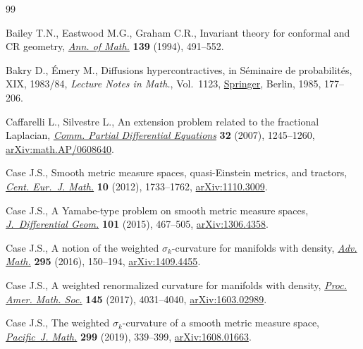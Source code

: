 \documentclass[pdftex]{sigma}
\numberwithin{equation}{section}
\begin{document}
\begin{thebibliography}{99}
\footnotesize\itemsep=-1pt

Bailey T.N., Eastwood M.G., Graham C.R., Invariant theory for conformal and
 {CR} geometry, \href{https://doi.org/10.2307/2118571}{\textit{Ann. of Math.}} \textbf{139} (1994), 491--552.

Bakry D., \'Emery M., Diffusions hypercontractives, in S\'eminaire de
 probabilit\'es, {XIX}, 1983/84, \textit{Lecture Notes in Math.}, Vol.~1123,
 \href{https://doi.org/10.1007/BFb0075847}{Springer}, Berlin, 1985, 177--206.

Caffarelli L., Silvestre L., An extension problem related to the fractional
 {L}aplacian, \href{https://doi.org/10.1080/03605300600987306}{\textit{Comm. Partial Differential Equations}} \textbf{32}
 (2007), 1245--1260, \href{https://arxiv.org/abs/math.AP/0608640}{arXiv:math.AP/0608640}.

Case J.S., Smooth metric measure spaces, quasi-{E}instein metrics, and
 tractors, \href{https://doi.org/10.2478/s11533-012-0091-x}{\textit{Cent. Eur.~J. Math.}} \textbf{10} (2012), 1733--1762,
 \href{https://arxiv.org/abs/1110.3009}{arXiv:1110.3009}.

Case J.S., A {Y}amabe-type problem on smooth metric measure spaces,
 \href{https://doi.org/10.4310/jdg/1445518921}{\textit{J.~Differential Geom.}} \textbf{101} (2015), 467--505,
 \href{https://arxiv.org/abs/1306.4358}{arXiv:1306.4358}.

Case J.S., A notion of the weighted {$\sigma_k$}-curvature for manifolds with
 density, \href{https://doi.org/10.1016/j.aim.2016.03.010}{\textit{Adv. Math.}} \textbf{295} (2016), 150--194,
 \href{https://arxiv.org/abs/1409.4455}{arXiv:1409.4455}.

Case J.S., A weighted renormalized curvature for manifolds with density,
 \href{https://doi.org/10.1090/proc/13566}{\textit{Proc. Amer. Math. Soc.}} \textbf{145} (2017), 4031--4040,
 \href{https://arxiv.org/abs/1603.02989}{arXiv:1603.02989}.

Case J.S., The weighted {$\sigma_k$}-curvature of a smooth metric measure
 space, \href{https://doi.org/10.2140/pjm.2019.299.339}{\textit{Pacific~J. Math.}} \textbf{299} (2019), 339--399,
 \href{https://arxiv.org/abs/1608.01663}{arXiv:1608.01663}.


\end{thebibliography}
\end{document}
